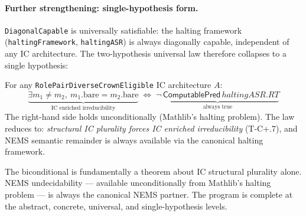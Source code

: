 \documentclass[11pt]{article}
\begin{document}
\paragraph{Further strengthening: single-hypothesis form.}
\texttt{DiagonalCapable} is universally satisfiable: the halting framework
(\texttt{haltingFramework}, \texttt{haltingASR}) is always diagonally capable,
independent of any IC architecture.  The two-hypothesis universal law therefore
collapses to a single hypothesis:

\begin{theorem}
\label{thm:single}
For any \texttt{RolePairDiverseCrownEligible} IC architecture $A$:
\[
\underbrace{\exists m_1 \neq m_2,\ m_1.\text{bare} = m_2.\text{bare}}_{\text{IC enriched irreducibility}}
\;\Longleftrightarrow\;
\underbrace{\neg\,\mathsf{ComputablePred}\,\mathit{haltingASR.RT}}_{\text{always true}}
\]
The right-hand side holds unconditionally (Mathlib's halting problem).  The law reduces
to: \emph{structural IC plurality forces IC enriched irreducibility} (T-C+.7), and NEMS
semantic remainder is always available via the canonical halting framework.
\par{}
\end{theorem}

The biconditional is fundamentally a theorem about IC structural plurality alone.
NEMS undecidability --- available unconditionally from Mathlib's halting problem ---
is always the canonical NEMS partner.  The program is complete at the abstract,
concrete, universal, and single-hypothesis levels.
\end{document}
